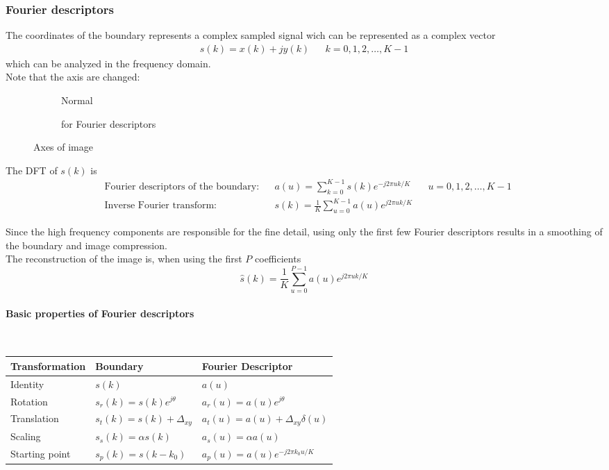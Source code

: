 \subsubsection{Fourier descriptors}
The coordinates of the boundary represents a complex sampled signal wich can be represented as a complex vector 
\begin{align*}
s(k)=x(k)+jy(k) && k=0,1,2,\ldots,K-1
\end{align*} 
which can be analyzed in the frequency domain.\\

Note that the axis are changed:
\begin{figure}[h]
	\begin{subfigure}{0.5\textwidth}
		 \centering
		 
		 \caption{Normal}
	\end{subfigure}
	\begin{subfigure}{0.5\textwidth}
		\centering
		
		\caption{for Fourier descriptors}
	\end{subfigure}
	\caption{Axes of image}
\end{figure}

The DFT of $s(k)$ is \begin{align*}
& \text{Fourier descriptors of the boundary:} && a(u)=\sum\limits_{k=0}^{K-1}s(k)e^{-j2\pi uk/K} && u=0,1,2,\ldots,K-1\\
& \text{Inverse Fourier transform:} && s(k)=\frac{1}{K}\sum\limits_{u=0}^{K-1}a(u)e^{j2\pi uk/K}
\end{align*} 

Since the high frequency components are responsible for the fine detail, using only the first few Fourier descriptors results in a smoothing of the boundary and image compression.\\
The reconstruction of the image is, when using the first $P$ coefficients
	\[
	\hat{s}(k) = \frac{1}{K} \sum\limits_{u=0}^{P-1} a(u) e^{j 2 \pi u k / K}
	\]

\paragraph{Basic properties of Fourier descriptors} ~\\

\begin{tabularx}{\textwidth}{XXX}
Transformation & Boundary & Fourier Descriptor \\\hline
Identity & $s(k)$ & $a(u)$ \\
Rotation & $s_r(k)=s(k)e^{j\theta}$& $a_r(u)=a(u)e^{j\theta}$ \\
Translation &$s_t(k)=s(k)+\Delta_{xy}$& $a_t(u)=a(u)+\Delta_{xy}\delta(u)$ \\
Scaling &$s_s(k)=\alpha s(k)$& $a_s(u)=\alpha a(u)$ \\
Starting point & $s_p(k)=s(k-k_0)$& $a_p(u)=a(u)e^{-j2\pi k_0u/K}$ \\ \hline
\end{tabularx}


